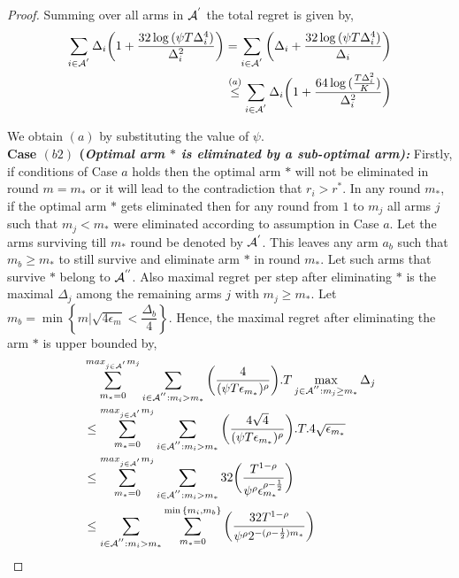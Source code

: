 \begin{proof}
Summing over all arms in $\mathcal{A}^{'}$ the total regret is given by, 
\begin{align*}
\sum_{i\in \mathcal{A}^{'}}\Delta_{i}\bigg(1+\dfrac{32\log{(\psi T\Delta_{i}^{4}})}{\Delta_{i}^{2}}\bigg) = \sum_{i\in \mathcal{A}^{'}}\bigg(\Delta_{i} +\dfrac{32\log{(\psi T\Delta_{i}^{4}})}{\Delta_{i}}\bigg) \\
\overset{(a)}{\leq} \sum_{i\in \mathcal{A}^{'}} \Delta_{i}\bigg(1+\dfrac{64\log{( \frac{T\Delta_{i}^{2}}{K})}}{\Delta_{i}^{2}}\bigg)
\end{align*}

We obtain $(a)$ by substituting the value of $\psi$. \\

\noindent
\textbf{Case $(b2)$ (\textit{Optimal arm ${*}$ is eliminated by a sub-optimal arm):  }} Firstly, if conditions of Case $a$ holds then the optimal arm ${*}$ will not be eliminated in round $m=m_{*}$ or it will lead to the contradiction that $r_{i}>r^{*}$. In any round $m_{*}$, if the optimal arm ${*}$ gets eliminated then for any round from $1$ to $m_{j}$ all arms ${j}$ such that $m_{j}< m_{*}$ were eliminated according to assumption in Case $a$. Let the arms surviving till $m_{*}$ round be denoted by $\mathcal{A}^{'}$. This leaves any arm $a_{b}$ such that $m_{b}\geq m_{*}$ to still survive and eliminate arm ${*}$ in round $m_{*}$. Let such arms that survive ${*}$ belong to $\mathcal{A}^{''}$. Also maximal regret per step after eliminating ${*}$ is the maximal $\Delta_{j}$ among the remaining arms ${j}$ with $m_{j}\geq m_{*}$.  Let $m_{b}=\min\left\lbrace m|\sqrt{4\epsilon_{m}}<\dfrac{\Delta_{b}}{4}\right\rbrace$. Hence, the maximal regret after eliminating the arm ${*}$ is upper bounded by, 
\begin{align*}
&\sum_{m_{*}=0}^{max_{j\in \A^{'}}m_{j}}\sum_{i\in \A^{''}:m_{i}>m_{*}}\bigg(\dfrac{4}{(\psi  T\epsilon_{m_{*}})^{\rho}} \bigg).T\max_{j\in \A^{''}:m_{j}\geq m_{*}}{\Delta}_{j}\\
&\leq\sum_{m_{*}=0}^{max_{j\in \A^{'}}m_{j}}\sum_{i\in \A^{''}:m_{i}>m_{*}}\bigg(\dfrac{4\sqrt{4}}{(\psi  T\epsilon_{m_{*}})^{\rho}} \bigg).T.4\sqrt{\epsilon_{m_{*}}}\\
&\leq\sum_{m_{*}=0}^{max_{j\in \A^{'}}m_{j}}\sum_{i\in \A^{''}:m_{i}>m_{*}}32\bigg(\dfrac{T^{1-\rho}}{\psi^{\rho}\epsilon_{m_{*}}^{\rho-\frac{1}{2}}} \bigg)\\
&\leq\sum_{i\in \A^{''}:m_{i}>m_{*}}\sum_{m_{*}=0}^{\min{\lbrace m_{i},m_{b}\rbrace}}\bigg(\dfrac{32T^{1-\rho}}{\psi^{\rho}2^{-(\rho -\frac{1}{2})m_{*}}} \bigg)\\

\end{align*}
\end{proof}
